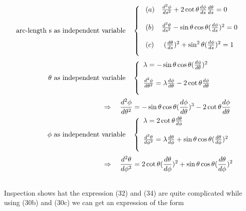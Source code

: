\begin{align}
\text{arc-length s as independent variable}\quad& \left \{ \begin{array}{ll}
\ (a)&\dv[2]{\phi}{s} + 2 \cot\theta\dv{\phi}{s} \dv{\theta}{s} = 0\\\\
\ (b)&\dv[2]{\theta}{s} - \sin\theta\cos\theta(\dv{\phi}{s})^2  = 0\\\\
\ (c)&\ (\dv{\theta}{s})^2+\sin^2\theta(\dv{\phi}{s})^2 = 1\\\\
\end{array}\right.\\
\theta \text{ as independent variable}\quad& \left \{ \begin{array}{l}
\lambda =  - \sin\theta\cos\theta(\dv{\phi}{\theta})^2\\\\
\dv[2]{\phi}{\theta}  = \lambda \dv{\phi}{\theta}- 2 \cot\theta\dv{\phi}{\theta}  \\\\
\end{array}\right.\\
\Rightarrow \quad \dv[2]{\phi}{\theta}  &= - \sin\theta\cos\theta(\dv{\phi}{\theta})^3- 2 \cot\theta\dv{\phi}{\theta}  \\
\phi \text{ as independent variable}\quad& \left \{ \begin{array}{l}
\lambda =  2 \cot\theta\dv{\theta}{\phi}\\\\
\dv[2]{\theta}{\phi}  = \lambda \dv{\theta}{\phi} + \sin\theta\cos\theta(\dv{\theta}{\phi})^2 \\\\
\end{array}\right.\\
\Rightarrow \quad \dv[2]{\theta}{\phi}  &= 2 \cot\theta(\dv{\theta}{\phi})^2 + \sin\theta\cos\theta(\dv{\theta}{\phi})^2 \\
\
\end{align}
Inspection shows hat the expression (32) and (34) are quite complicated while using (30b) and (30c) we can get an expression of the form
